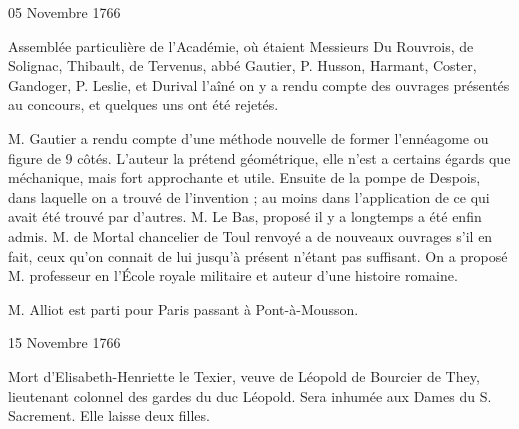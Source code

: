                      \begin{diary}{05 Novembre 1766}{}

                         Assemblée particulière de l’Académie, où
                           étaient Messieurs
                           Du Rouvrois, de Solignac, Thibault,
                           de Tervenus, abbé Gautier, P.
                              Husson, Harmant,
                           Coster, Gandoger, P. Leslie, et
                              Durival l'aîné
                           on y a rendu compte des ouvrages présentés
                           au concours, et quelques uns ont été rejetés. \bigskip




                           M. Gautier a rendu compte d’une
                           méthode nouvelle
                           de former l’ennéagome ou figure de 9 côtés.
                           L’auteur la prétend géométrique, elle n’est a certains
                           égards que méchanique, mais fort approchante et
                           utile. Ensuite de la pompe de Despois, dans
                           laquelle on a trouvé de l’invention ; au moins
                           dans l’application de ce qui avait été trouvé
                           par d’autres. M. Le Bas, proposé
                           il y a
                           longtemps a été enfin admis. M. de
                              Mortal
                           chancelier de Toul renvoyé a de nouveaux ouvrages
                           s’il en fait, ceux qu’on connait de lui jusqu’à
                           présent n’étant pas suffisant. On a proposé
                           M.  professeur en l’École royale
                              militaire
                           et auteur d’une histoire romaine. \bigskip



                           M. Alliot est parti pour Paris passant à Pont-à-Mousson. \bigskip


                     \end{diary}


                     \begin{diary}{15 Novembre 1766}{}

                         Mort d’Elisabeth-Henriette le Texier, veuve
                           de Léopold de Bourcier de
                              They, lieutenant colonnel
                           des gardes du duc Léopold.
                           Sera inhumée
                           aux Dames du S.
                              Sacrement. Elle laisse
                           deux filles. \bigskip


                     \end{diary}

